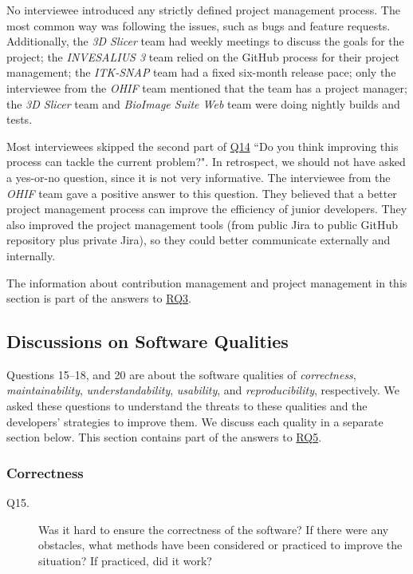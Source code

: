 \documentclass[preprint,12pt,authoryear]{elsarticle}
\begin{document}
No interviewee introduced any strictly defined project management process. The
most common way was following the issues, such as bugs and feature requests.
Additionally, the \textit{3D Slicer} team had weekly meetings to discuss the
goals for the project; the \textit{INVESALIUS 3} team relied on the GitHub
process for their project management; the \textit{ITK-SNAP} team had a fixed
six-month release pace; only the interviewee from the \textit{OHIF} team
mentioned that the team has a project manager; the \textit{3D Slicer} team and
\textit{BioImage Suite Web} team were doing nightly builds and tests.

Most interviewees skipped the second part of \hyperlink{q14}{Q14} ``Do you think
improving this process can tackle the current problem?". In retrospect, we
should not have asked a yes-or-no question, since it is not very informative.
The interviewee from the \textit{OHIF} team gave a positive answer to this
question. They believed that a better project management process can improve the
efficiency of junior developers. They also improved the project management tools
(from public Jira to public GitHub repository plus private Jira), so they could
better communicate externally and internally.

The information about contribution management and project management in this
section is part of the answers to \hyperlink{rq3}{RQ3}.

\subsection{Discussions on Software Qualities} \label{sec_interview_software_qualities}

Questions 15--18, and 20 are about the software qualities of
\textit{correctness}, \textit{maintainability}, \textit{understandability},
\textit{usability}, and \textit{reproducibility}, respectively. We asked these
questions to understand the threats to these qualities and the developers'
strategies to improve them. We discuss each quality in a separate section below.
This section contains part of the answers to \hyperlink{rq5}{RQ5}.

\subsubsection{Correctness} \label{sec_interview_correctness}

\begin{description}
\item[Q15.] Was it hard to ensure the correctness of the software? If there were
any obstacles, what methods have been considered or practiced to improve the
situation? If practiced, did it work?
\end{description}
\end{document}

